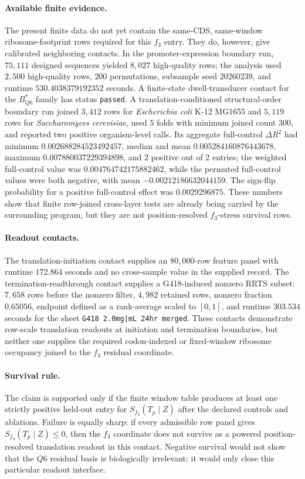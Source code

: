 \paragraph{Available finite evidence.}
The present finite data do not yet contain the same-CDS, same-window ribosome-footprint rows required for this $f_3$ entry.  They do, however, give calibrated neighboring contacts.  In the promoter-expression boundary run, $75{,}111$ designed sequences yielded $8{,}027$ high-quality rows; the analysis used $2{,}500$ high-quality rows, $200$ permutations, subsample seed $20260239$, and runtime $530.4038379192352$ seconds.  A finite-state dwell-transducer contact for the $B^*_{Q6}$ family has status \texttt{passed}.  A translation-conditioned structural-order boundary run joined $3{,}412$ rows for \textit{Escherichia coli} K-12 MG1655 and $5{,}119$ rows for \textit{Saccharomyces cerevisiae}, used $5$ folds with minimum joined count $300$, and reported two positive organism-level calls.  Its aggregate full-control $\Delta R^2$ had minimum $0.002688284523492457$, median and mean $0.005284160876443678$, maximum $0.007880037229394898$, and $2$ positive out of $2$ entries; the weighted full-control value was $0.004764742175882462$, while the permuted full-control values were both negative, with mean $-0.00212186632044159$.  The sign-flip probability for a positive full-control effect was $0.0029296875$.  These numbers show that finite row-joined cross-layer tests are already being carried by the surrounding program, but they are not position-resolved $f_3$-stress survival rows.

\paragraph{Readout contacts.}
The translation-initiation contact supplies an $80{,}000$-row feature panel with runtime $172.864$ seconds and no cross-sample value in the supplied record.  The termination-readthrough contact supplies a G418-induced nonzero RRTS subset: $7{,}658$ rows before the nonzero filter, $4{,}982$ retained rows, nonzero fraction $0.65056$, endpoint defined as a rank-average scaled to $[0,1]$, and runtime $303.534$ seconds for the sheet \texttt{G418 2.0mg|mL 24hr merged}.  These contacts demonstrate row-scale translation readouts at initiation and termination boundaries, but neither one supplies the required codon-indexed or fixed-window ribosome occupancy joined to the $f_3$ residual coordinate.

\paragraph{Survival rule.}
The claim is supported only if the finite window table produces at least one strictly positive held-out entry for $S_{f_3}(T_p\mid Z)$ after the declared controls and ablations.  Failure is equally sharp: if every admissible row panel gives $S_{f_3}(T_p\mid Z)\leq 0$, then the $f_3$ coordinate does not survive as a powered position-resolved translation readout in this contact.  Negative survival would not show that the $Q6$ residual basis is biologically irrelevant; it would only close this particular readout interface.

